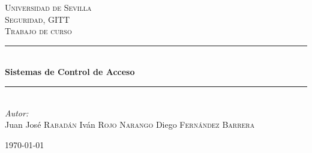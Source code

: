 \documentclass{article} %
\begin{document}

\begin{titlepage}

\newcommand{\HRule}{\rule{\linewidth}{0.5mm}} %

\center %

\textsc{\LARGE Universidad de Sevilla}\\[1.5cm] %
\textsc{\Large Seguridad, GITT}\\[0.5cm] %
\textsc{\large Trabajo de curso}\\[0.5cm] %

\HRule \\[0.4cm]
{ \huge \bfseries Sistemas de Control de Acceso}\\[0.4cm] %
\HRule \\[1.5cm]

\large
\emph{Autor:}\\

Juan José \textsc{Rabadán}
Iván \textsc{Rojo Narango}
Diego \textsc{Fernández Barrera}

\hspace{3cm}

{\large \today}\\ %

\vfill %

\end{titlepage}

\end{document}
